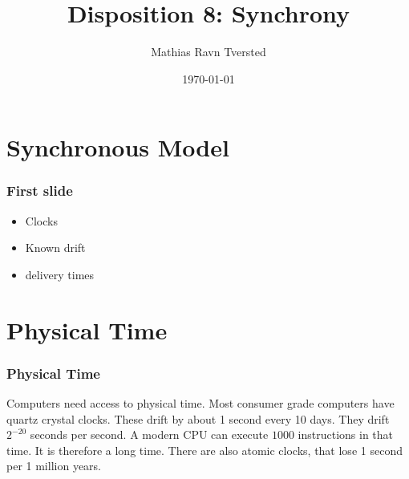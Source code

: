 
\newcommand{\N}{\mathbb{N}}
\title{Disposition 8: Synchrony}   
\author{Mathias Ravn Tversted} 
\date{\today} 




\frame{\titlepage} 







\section{Synchronous Model}
        \begin{frame}
            \frametitle{First slide}
                \begin{itemize}
                    \item Clocks
                    \item Known drift
                    \item delivery times
                \end{itemize}    
        
        \end{frame}
\section{Physical Time}
        \begin{frame}
            \frametitle{Physical Time}   
            Computers need access to physical time. Most consumer grade computers have quartz crystal clocks. These drift by about 1 second every 10 days. They drift $2^{-20}$ seconds per second. A modern CPU can execute $1000$ instructions in that time. It is therefore a long time. There are also atomic clocks, that lose 1 second per 1 million years. 
        \end{frame}
